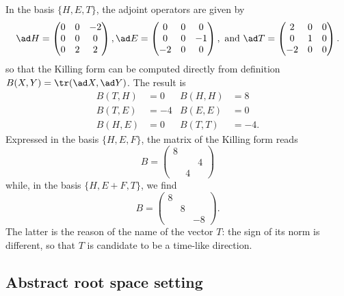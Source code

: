 In the basis $\{ H,E,T \}$, the adjoint operators are given by
\[
	\ad H=\begin{pmatrix}
		0 & 0 & -2 \\
		0 & 0 & 0  \\
		0 & 2 & 2
	\end{pmatrix},
	\ad E=\begin{pmatrix}
		0  & 0 & 0  \\
		0  & 0 & -1 \\
		-2 & 0 & 0
	\end{pmatrix},\textrm{ and }
	\ad T=\begin{pmatrix}
		2  & 0 & 0 \\
		0  & 1 & 0 \\
		-2 & 0 & 0
	\end{pmatrix}.
\]
so that the Killing form can be computed directly from definition $B(X,Y)=\tr(\ad X,\ad Y)$. The result is
\begin{subequations}
	\begin{align}
		B(T,H) & =0  & B(H,H) & =8   \\
		B(T,E) & =-4 & B(E,E) & =0   \\
		B(H,E) & =0  & B(T,T) & =-4.
	\end{align}
\end{subequations}
Expressed in the basis $\{H,E,F\}$, the matrix of the Killing form reads
\begin{equation}
	B=
	\begin{pmatrix}
		8 &   &   \\
		  &   & 4 \\
		  & 4 &
	\end{pmatrix}
\end{equation}
while, in the basis  $\{H,E+F,T\}$, we find
\begin{equation}   \label{EqBHEFTsldR}
	B=
	\begin{pmatrix}
		8         \\
		 & 8      \\
		 &   & -8
	\end{pmatrix}.
\end{equation}
The latter is the reason of the name of the vector $T$: the sign of its norm is different, so that $T$ is candidate to be a time-like direction.

\subsection{Abstract root space setting}

